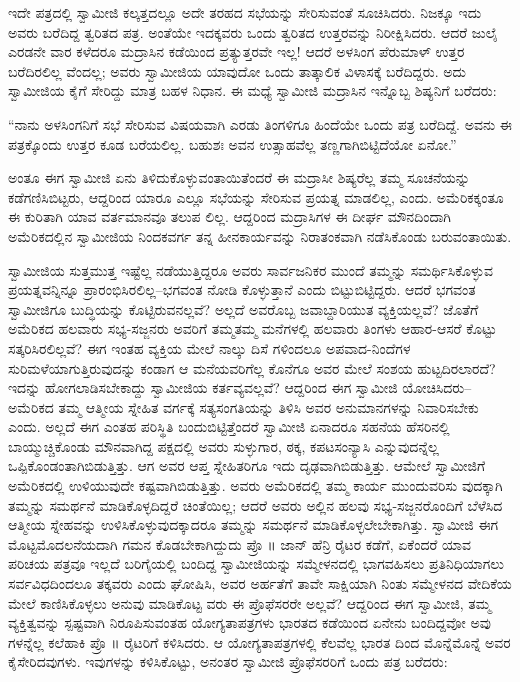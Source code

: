 ಇದೇ ಪತ್ರದಲ್ಲಿ ಸ್ವಾಮೀಜಿ ಕಲ್ಕತ್ತದಲ್ಲೂ ಅದೇ ತರಹದ ಸಭೆಯನ್ನು ಸೇರಿಸುವಂತೆ ಸೂಚಿಸಿದರು. ನಿಜಕ್ಕೂ ಇದು ಅವರು ಬರೆದಿದ್ದ ತ್ವರಿತದ ಪತ್ರ. ಅಂತೆಯೇ ಇದಕ್ಕವರು ಒಂದು ತ್ವರಿತದ ಉತ್ತರವನ್ನು ನಿರೀಕ್ಷಿಸಿದರು. ಆದರೆ ಜುಲೈ ಎರಡನೇ ವಾರ ಕಳೆದರೂ ಮದ್ರಾಸಿನ ಕಡೆಯಿಂದ ಪ್ರತ್ಯುತ್ತರವೇ ಇಲ್ಲ! ಆದರೆ ಅಳಸಿಂಗ ಪೆರುಮಾಳ್ ಉತ್ತರ ಬರೆದಿರಲಿಲ್ಲ ವೆಂದಲ್ಲ; ಅವರು ಸ್ವಾಮೀಜಿಯ ಯಾವುದೋ ಒಂದು ತಾತ್ಕಾಲಿಕ ವಿಳಾಸಕ್ಕೆ ಬರೆದಿದ್ದರು. ಅದು ಸ್ವಾಮೀಜಿಯ ಕೈಗೆ ಸೇರಿದ್ದು ಮಾತ್ರ ಬಹಳ ನಿಧಾನ. ಈ ಮಧ್ಯೆ ಸ್ವಾಮೀಜಿ ಮದ್ರಾಸಿನ ಇನ್ನೊಬ್ಬ ಶಿಷ್ಯನಿಗೆ ಬರೆದರು:

“ನಾನು ಅಳಸಿಂಗನಿಗೆ ಸಭೆ ಸೇರಿಸುವ ವಿಷಯವಾಗಿ ಎರಡು ತಿಂಗಳಿಗೂ ಹಿಂದೆಯೇ ಒಂದು ಪತ್ರ ಬರೆದಿದ್ದೆ. ಅವನು ಈ ಪತ್ರಕ್ಕೊಂದು ಉತ್ತರ ಕೂಡ ಬರೆಯಲಿಲ್ಲ. ಬಹುಶಃ ಅವನ ಉತ್ಸಾಹವೆಲ್ಲ ತಣ್ಣಗಾಗಿಬಿಟ್ಟಿದೆಯೋ ಏನೋ.”

ಅಂತೂ ಈಗ ಸ್ವಾಮೀಜಿ ಏನು ತಿಳಿದುಕೊಳ್ಳುವಂತಾಯಿತೆಂದರೆ ಈ ಮದ್ರಾಸೀ ಶಿಷ್ಯರೆಲ್ಲ ತಮ್ಮ ಸೂಚನೆಯನ್ನು ಕಡೆಗಣಿಸಿಬಿಟ್ಟರು, ಆದ್ದರಿಂದ ಯಾರೂ ಎಲ್ಲೂ ಸಭೆಯನ್ನು ಸೇರಿಸುವ ಪ್ರಯತ್ನ ಮಾಡಲಿಲ್ಲ, ಎಂದು. ಅಮೆರಿಕಕ್ಕಂತೂ ಈ ಕುರಿತಾಗಿ ಯಾವ ವರ್ತಮಾನವೂ ತಲುಪ ಲಿಲ್ಲ. ಆದ್ದರಿಂದ ಮದ್ರಾಸಿಗಳ ಈ ದೀರ್ಘ ಮೌನದಿಂದಾಗಿ ಅಮೆರಿಕದಲ್ಲಿನ ಸ್ವಾಮೀಜಿಯ ನಿಂದಕವರ್ಗ ತನ್ನ ಹೀನಕಾರ್ಯವನ್ನು ನಿರಾತಂಕವಾಗಿ ನಡೆಸಿಕೊಂಡು ಬರುವಂತಾಯಿತು.

ಸ್ವಾಮೀಜಿಯ ಸುತ್ತಮುತ್ತ ಇಷ್ಟೆಲ್ಲ ನಡೆಯುತ್ತಿದ್ದರೂ ಅವರು ಸಾರ್ವಜನಿಕರ ಮುಂದೆ ತಮ್ಮನ್ನು ಸಮರ್ಥಿಸಿಕೊಳ್ಳುವ ಪ್ರಯತ್ನವನ್ನಿನ್ನೂ ಪ್ರಾರಂಭಿಸಿರಲಿಲ್ಲ–ಭಗವಂತ ನೋಡಿ ಕೊಳ್ಳುತ್ತಾನೆ ಎಂದು ಬಿಟ್ಟುಬಿಟ್ಟಿದ್ದರು. ಆದರೆ ಭಗವಂತ ಸ್ವಾಮೀಜಿಗೂ ಬುದ್ಧಿಯನ್ನು ಕೊಟ್ಟಿರುವನಲ್ಲವೆ? ಅಲ್ಲದೆ ಅವರೊಬ್ಬ ಜವಾಬ್ದಾರಿಯುತ ವ್ಯಕ್ತಿಯಲ್ಲವೆ? ಜೊತೆಗೆ ಅಮೆರಿಕದ ಹಲವಾರು ಸಭ್ಯ-ಸಜ್ಜನರು ಅವರಿಗೆ ತಮ್ಮತಮ್ಮ ಮನೆಗಳಲ್ಲಿ ಹಲವಾರು ತಿಂಗಳು ಆಹಾರ-ಆಸರೆ ಕೊಟ್ಟು ಸತ್ಕರಿಸಿರಲಿಲ್ಲವೆ? ಈಗ ಇಂತಹ ವ್ಯಕ್ತಿಯ ಮೇಲೆ ನಾಲ್ಕು ದಿಸೆ ಗಳಿಂದಲೂ ಅಪವಾದ-ನಿಂದೆಗಳ ಸುರಿಮಳೆಯಾಗುತ್ತಿರುವುದನ್ನು ಕಂಡಾಗ ಆ ಮನೆಯವರಿಗೆಲ್ಲ ಕೊನೆಗೂ ಅವರ ಮೇಲೆ ಸಂಶಯ ಹುಟ್ಟದಿರಲಾರದೆ? ಇದನ್ನು ಹೋಗಲಾಡಿಸಬೇಕಾದ್ದು ಸ್ವಾಮೀಜಿಯ ಕರ್ತವ್ಯವಲ್ಲವೆ? ಆದ್ದರಿಂದ ಈಗ ಸ್ವಾಮೀಜಿ ಯೋಚಿಸಿದರು–ಅಮೆರಿಕದ ತಮ್ಮ ಆತ್ಮೀಯ ಸ್ನೇಹಿತ ವರ್ಗಕ್ಕೆ ಸತ್ಯಸಂಗತಿಯನ್ನು ತಿಳಿಸಿ ಅವರ ಅನುಮಾನಗಳನ್ನು ನಿವಾರಿಸಬೇಕು ಎಂದು. ಅಲ್ಲದೆ ಈಗ ಎಂತಹ ಪರಿಸ್ಥಿತಿ ಬಂದುಬಿಟ್ಟಿತ್ತೆಂದರೆ ಸ್ವಾಮೀಜಿ ಏನಾದರೂ ಸಹನೆಯ ಹೆಸರಿನಲ್ಲಿ ಬಾಯ್ಮುಚ್ಚಿಕೊಂಡು ಮೌನವಾಗಿದ್ದ ಪಕ್ಷದಲ್ಲಿ ಅವರು ಸುಳ್ಳುಗಾರ, ಠಕ್ಕ, ಕಪಟಸಂನ್ಯಾಸಿ ಎನ್ನುವುದನ್ನೆಲ್ಲ ಒಪ್ಪಿಕೊಂಡಂತಾಗಿಬಿಡುತ್ತಿತ್ತು. ಆಗ ಅವರ ಆಪ್ತ ಸ್ನೇಹಿತರಿಗೂ ಇದು ದೃಢವಾಗಿಬಿಡುತ್ತಿತ್ತು. ಆಮೇಲೆ ಸ್ವಾಮೀಜಿಗೆ ಅಮೆರಿಕದಲ್ಲಿ ಉಳಿಯುವುದೇ ಕಷ್ಟವಾಗಿಬಿಡುತ್ತಿತ್ತು. ಅವರು ಅಮೆರಿಕದಲ್ಲಿ ತಮ್ಮ ಕಾರ್ಯ ಮುಂದುವರಿಸು ವುದಕ್ಕಾಗಿ ತಮ್ಮನ್ನು ಸಮರ್ಥನೆ ಮಾಡಿಕೊಳ್ಳದಿದ್ದರೆ ಚಿಂತೆಯಿಲ್ಲ; ಆದರೆ ಅವರು ಅಲ್ಲಿನ ಹಲವು ಸಭ್ಯ-ಸಜ್ಜನರೊಂದಿಗೆ ಬೆಳೆಸಿದ ಆತ್ಮೀಯ ಸ್ನೇಹವನ್ನು ಉಳಿಸಿಕೊಳ್ಳುವುದಕ್ಕಾದರೂ ತಮ್ಮನ್ನು ಸಮರ್ಥನೆ ಮಾಡಿಕೊಳ್ಳಲೇಬೇಕಾಗಿತ್ತು. ಸ್ವಾಮೀಜಿ ಈಗ ಮೊಟ್ಟಮೊದಲನೆಯದಾಗಿ ಗಮನ ಕೊಡಬೇಕಾಗಿದ್ದುದು ಪ್ರೊ ॥ ಜಾನ್ ಹೆನ್ರಿ ರೈಟರ ಕಡೆಗೆ, ಏಕೆಂದರೆ ಯಾವ ಪರಿಚಯ ಪತ್ರವೂ ಇಲ್ಲದೆ ಬರಿಗೈಯಲ್ಲಿ ಬಂದಿದ್ದ ಸ್ವಾಮೀಜಿಯನ್ನು ಸಮ್ಮೇಳನದಲ್ಲಿ ಭಾಗವಹಿಸಲು ಪ್ರತಿನಿಧಿಯಾಗಲು ಸರ್ವವಿಧದಿಂದಲೂ ತಕ್ಕವರು ಎಂದು ಘೋಷಿಸಿ, ಅವರ ಅರ್ಹತೆಗೆ ತಾವೇ ಸಾಕ್ಷಿಯಾಗಿ ನಿಂತು ಸಮ್ಮೇಳನದ ವೇದಿಕೆಯ ಮೇಲೆ ಕಾಣಿಸಿಕೊಳ್ಳಲು ಅನುವು ಮಾಡಿಕೊಟ್ಟ ವರು ಈ ಪ್ರೊಫೆಸರರೇ ಅಲ್ಲವೆ? ಆದ್ದರಿಂದ ಈಗ ಸ್ವಾಮೀಜಿ, ತಮ್ಮ ವ್ಯಕ್ತಿತ್ವವನ್ನು ಸ್ಪಷ್ಟವಾಗಿ ನಿರೂಪಿಸುವಂತಹ ಯೋಗ್ಯತಾಪತ್ರಗಳು ಭಾರತದ ಕಡೆಯಿಂದ ಏನೇನು ಬಂದಿದ್ದವೋ ಅವು ಗಳನ್ನೆಲ್ಲ ಕಲೆಹಾಕಿ ಪ್ರೊ ॥ ರೈಟರಿಗೆ ಕಳಿಸಿದರು. ಆ ಯೋಗ್ಯತಾಪತ್ರಗಳಲ್ಲಿ ಕೆಲವೆಲ್ಲ ಭಾರತ ದಿಂದ ಮೊನ್ನೆಮೊನ್ನೆ ಅವರ ಕೈಸೇರಿದವುಗಳು. ಇವುಗಳನ್ನು ಕಳಿಸಿಕೊಟ್ಟು, ಅನಂತರ ಸ್ವಾಮೀಜಿ ಪ್ರೊಫೆಸರರಿಗೆ ಒಂದು ಪತ್ರ ಬರೆದರು:

